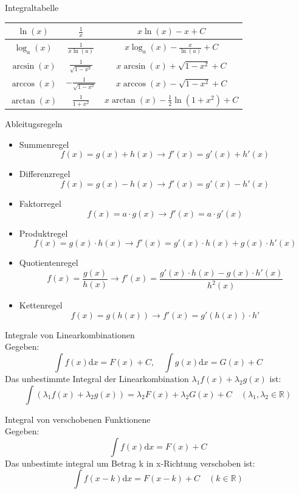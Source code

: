 \begin{lemma}{Integraltabelle}
{\begin{tabular}{|c|c|c|}
			\hline
			\(\ln(x)\)                                & \(\frac{1}{x}\)                           & \(x\ln(x)-x+C\)                         \\
			\hline
			\(\log_a(x)\)                             & \(\frac{1}{x\ln(a)}\)                     & \(x\log_a(x)-\frac{x}{\ln(a)}+C\)       \\
			\hline
			\(\arcsin(x)\)                            & \(\frac{1}{\sqrt{1-x^2}}\)                & \(x\arcsin(x)+\sqrt{1-x^2}+C\)          \\
			\hline
			\(\arccos(x)\)                            & \(-\frac{1}{\sqrt{1-x^2}}\)               & \(x\arccos(x)-\sqrt{1-x^2}+C\)          \\
			\hline
			\(\arctan(x)\)                            & \(\frac{1}{1+x^2}\)                       & \(x\arctan(x)-\frac{1}{2}\ln(1+x^2)+C\) \\
			\hline
		\end{tabular}
	}
\end{lemma}
\begin{lemma}{Ableitugsregeln}\\
	\begin{itemize}
		\item Summenregel
		    \[f(x)=g(x)+h(x) \rightarrow f'(x)=g'(x)+h'(x) \]
		\item Differenzregel
		    \[f(x)= g(x) - h(x) \rightarrow f'(x) = g'(x) - h'(x) \]
		\item Faktorregel 
		    \[f(x)=a\cdot g(x) \rightarrow f'(x)=a \cdot g'(x) \]
		\item Produktregel
		    \[f(x)=g(x)\cdot h(x) \rightarrow f'(x)=g'(x)\cdot h(x) + g(x) \cdot h'(x) \]
		\item Quotientenregel 
		    \[f(x)=\frac{g(x)}{h(x)} \rightarrow f'(x)=\frac{g'(x)\cdot h(x)-g(x)\cdot
		    h'(x)}{h^2(x)}\]
		\item Kettenregel
		    \[f(x)=g(h(x)) \rightarrow f'(x)=g'(h(x))\cdot h'\]
	\end{itemize}
\end{lemma}
\begin{lemma}{Integrale von Linearkombinationen}\\
	Gegeben:
	\[\int{f(x)\mathrm{d}x} = F(x)+C, \quad  \int{g(x)\mathrm{d}x} = G(x)+C\]
	Das unbestimmte Integral der Linearkombination \(\lambda_1f(x) + \lambda_2g(x)\) ist:
	\[\int{(\lambda_1f(x)+\lambda_2g(x))} = \lambda_2F(x)+\lambda_2G(x)+C \quad (\lambda_1,\lambda_2 \in \mathbb{R} )\]
\end{lemma}
\begin{lemma}{Integral von verschobenen Funktionene}\\
	Gegeben:
	\[\int{f(x)\mathrm{d}x} = F(x) + C \]
	Das unbestimte integral um Betrag k in x-Richtung verschoben ist:
	\[\int{f(x-k)\mathrm{d}x}= F(x-k)+C \quad (k \in \mathbb{R}) \]
\end{lemma}
